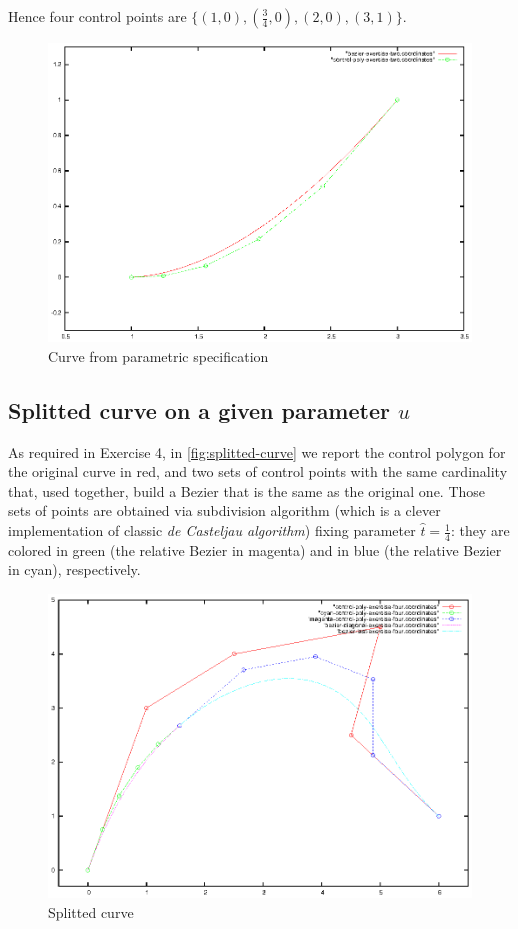 \documentclass{article}
\begin{document}
Hence four control points are $\{(1,0), (\frac{3}{4},0), (2,0),
(3,1)\}$.
\begin{figure}
  \centering
  \includegraphics{bezier-deCasteljau-curves/exercise-two}
  \caption{Curve from parametric specification}
  \label{fig:curve-from-parametric-spec}
\end{figure}

\subsection{Splitted curve on a given parameter $u$}
As required in Exercise 4, in \autoref{fig:splitted-curve} we report
the control polygon for the original curve in red, and two sets of
control points with the same cardinality that, used together, build a
Bezier that is the same as the original one. Those sets of points are
obtained via subdivision algorithm (which is a clever implementation of
classic \emph{de Casteljau algorithm}) fixing parameter $\hat{t} =
\frac{1}{4}$: they are colored in green (the relative Bezier in magenta)
and in blue (the relative Bezier in cyan), respectively.
\begin{figure}[h!]
  \centering
  \includegraphics{bezier-deCasteljau-curves/exercise-four}
  \caption{Splitted curve}
  \label{fig:splitted-curve}
\end{figure}
\end{document}
